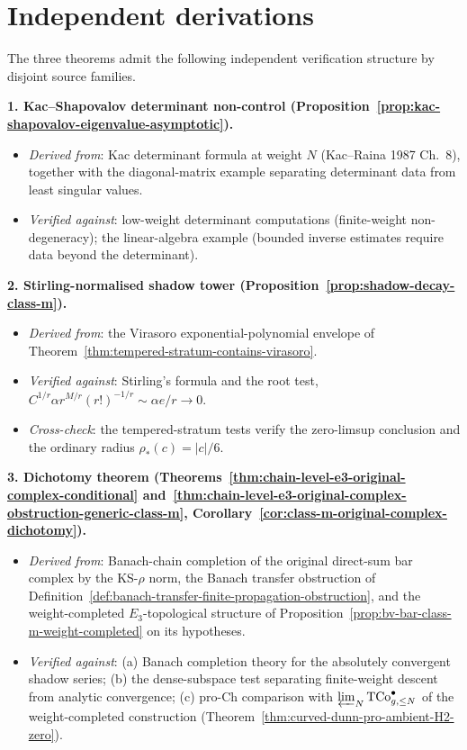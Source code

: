\section{Independent derivations}
\label{sec:original-complex-iv-summary}

The three theorems admit the following independent verification
structure by disjoint source families.

\textbf{1. Kac--Shapovalov determinant non-control
(Proposition~\ref{prop:kac-shapovalov-eigenvalue-asymptotic}).}
\begin{itemize}[nosep]
\item \emph{Derived from}: Kac determinant formula at weight $N$
 (Kac--Raina 1987 Ch.~8), together with the diagonal-matrix
 example separating determinant data from least singular values.
\item \emph{Verified against}: low-weight determinant computations
 (finite-weight non-degeneracy); the linear-algebra example
 (bounded inverse estimates require data beyond the determinant).
\end{itemize}

\textbf{2. Stirling-normalised shadow tower
(Proposition~\ref{prop:shadow-decay-class-m}).}
\begin{itemize}[nosep]
\item \emph{Derived from}: the Virasoro exponential-polynomial
 envelope of
 Theorem~\ref{thm:tempered-stratum-contains-virasoro}.
\item \emph{Verified against}: Stirling's formula and the root test,
 $C^{1/r}\alpha r^{M/r}(r!)^{-1/r}\sim \alpha e/r\to 0$.
\item \emph{Cross-check}: the tempered-stratum tests verify the
 zero-limsup conclusion and the ordinary radius
 $\rho_*(c)=\lvert c\rvert/6$.
\end{itemize}

\textbf{3. Dichotomy theorem
(Theorems~\ref{thm:chain-level-e3-original-complex-conditional}
and~\ref{thm:chain-level-e3-original-complex-obstruction-generic-class-m},
Corollary~\ref{cor:class-m-original-complex-dichotomy}).}
\begin{itemize}[nosep]
\item \emph{Derived from}: Banach-chain completion of the original
 direct-sum bar complex by the KS-$\rho$ norm, the Banach transfer
 obstruction of
 Definition~\ref{def:banach-transfer-finite-propagation-obstruction},
 and the weight-completed $E_3$-topological structure of
 Proposition~\ref{prop:bv-bar-class-m-weight-completed} on its
 hypotheses.
\item \emph{Verified against}: (a) Banach completion theory for the
 absolutely convergent shadow series; (b) the dense-subspace test
 separating finite-weight descent from analytic convergence;
 (c) pro-$\mathrm{Ch}$ comparison with
 $\varprojlim_N \mathrm{TCo}^{\bullet}_{g,\le N}$ of the
 weight-completed construction
 (Theorem~\ref{thm:curved-dunn-pro-ambient-H2-zero}).
\end{itemize}

